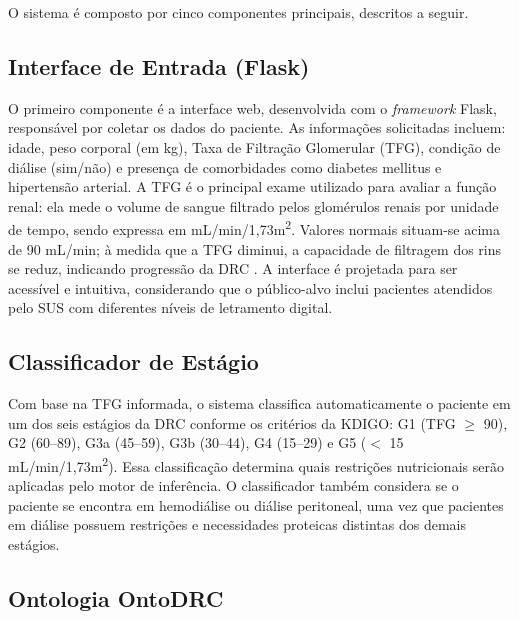 \documentclass[12pt, a4paper, twocolumn]{article}
\begin{document}
O sistema é composto por cinco componentes principais, descritos a seguir.

    \subsection{Interface de Entrada (Flask)}

O primeiro componente é a interface web, desenvolvida com o \textit{framework} Flask, responsável por coletar os dados do paciente. As informações solicitadas incluem: idade, peso corporal (em kg), Taxa de Filtração Glomerular (TFG), condição de diálise (sim/não) e presença de comorbidades como diabetes mellitus e hipertensão arterial. A TFG é o principal exame utilizado para avaliar a função renal: ela mede o volume de sangue filtrado pelos glomérulos renais por unidade de tempo, sendo expressa em mL/min/1,73m\textsuperscript{2}. Valores normais situam-se acima de 90 mL/min; à medida que a TFG diminui, a capacidade de filtragem dos rins se reduz, indicando progressão da DRC \cite{kdigo2024}. A interface é projetada para ser acessível e intuitiva, considerando que o público-alvo inclui pacientes atendidos pelo SUS com diferentes níveis de letramento digital.

    \subsection{Classificador de Estágio}

Com base na TFG informada, o sistema classifica automaticamente o paciente em um dos seis estágios da DRC conforme os critérios da KDIGO: G1 (TFG $\geq$ 90), G2 (60--89), G3a (45--59), G3b (30--44), G4 (15--29) e G5 ($<$ 15 mL/min/1,73m\textsuperscript{2}). Essa classificação determina quais restrições nutricionais serão aplicadas pelo motor de inferência. O classificador também considera se o paciente se encontra em hemodiálise ou diálise peritoneal, uma vez que pacientes em diálise possuem restrições e necessidades proteicas distintas dos demais estágios.

    \subsection{Ontologia OntoDRC}
\end{document}
